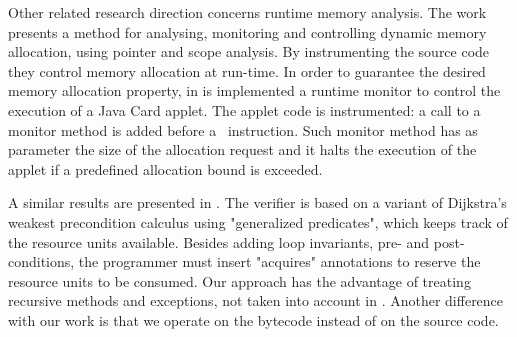 Other related research direction concerns runtime memory analysis. The work \cite{GNYZ04pir} presents a method for analysing, monitoring and controlling dynamic memory allocation, using pointer and scope analysis. By instrumenting the source code they control memory allocation at run-time. In order to guarantee the desired memory allocation property, in \cite{fredlund04gcp} is implemented a runtime monitor to control the execution of a Java Card applet. The applet code is instrumented: a call to a monitor method is added before a \new\ instruction. Such monitor method has as parameter the size of the allocation request and it halts the execution of the applet if a predefined allocation bound is exceeded. 


A similar results are presented in  \cite{CEILN05}. The verifier is based on a variant of Dijkstra's
weakest precondition calculus using "generalized predicates", which keeps
track of the resource units available. Besides adding loop invariants,
pre- and post-conditions, the programmer must insert "acquires"
annotations to reserve the resource units to be consumed. Our approach has
the advantage of treating recursive methods and exceptions, not taken into
account in \cite{CEILN05}. Another difference with our work is that we
operate on the bytecode instead of on the source code.



